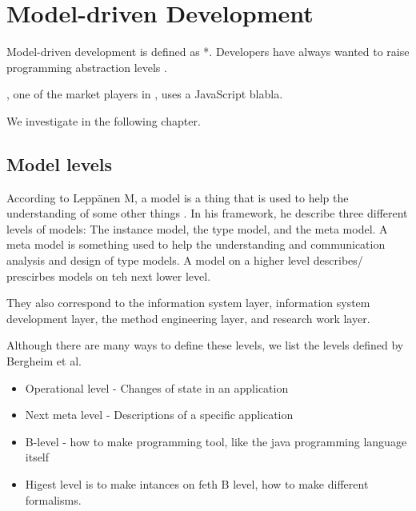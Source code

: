 \section{Model-driven Development}
\label{sec:Model-driven Development}
Model-driven development is defined as *. Developers have always wanted to raise programming abstraction levels \cite{Atkinson2003-wr}.


\mendix, one of the market players in \mdd, uses a JavaScript blabla.

We investigate \gap in the following chapter.

\subsection{Model levels}
\label{sub:Model levels}
According to Leppänen M, a model is a thing that is used to help the understanding of some other things \cite{Leppanen2006-ay}. In his framework, he describe three different levels of models: The instance model, the type model, and the meta model. A meta model is something used to help the understanding and communication analysis and design of type models. A model on a higher level describes/ prescirbes models on teh next lower level.

They also correspond to the information system layer, information system development layer, the method engineering layer, and research work layer.

Although there are many ways to define these levels, we list the levels defined by Bergheim et al.
\begin{itemize}
    \item Operational level - Changes of state in an application
    \item Next meta level - Descriptions of a specific application
    \item B-level - how to make programming tool, like the java programming language itself
    \item Higest level is to make intances on feth B level, how to make different formalisms.
\end{itemize}


